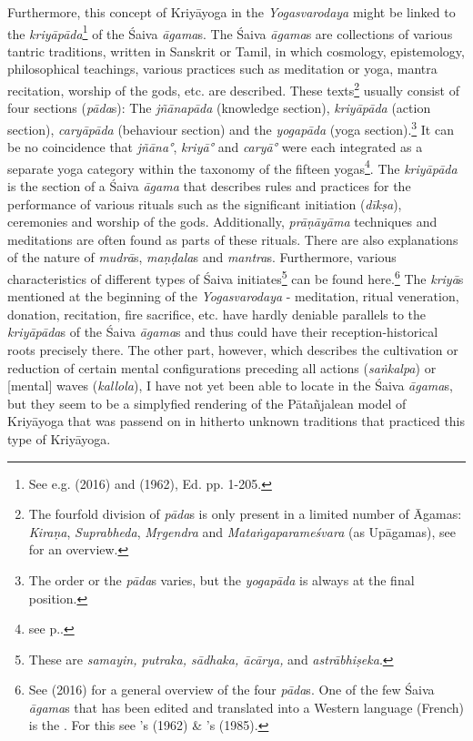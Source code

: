 Furthermore, this concept of Kriyāyoga in the \textit{Yogasvarodaya} might be linked to the \textit{kriyāpāda}\footnote{See e.g. \citeauthor{ganesan2016saiva} (2016) and  (1962), Ed. pp. 1-205.} of the Śaiva \textit{āgama}s. The Śaiva \textit{āgama}s are collections of various tantric traditions, written in Sanskrit or Tamil, in which cosmology, epistemology, philosophical teachings, various practices such as meditation or yoga, mantra recitation, worship of the gods, etc. are described. These texts\footnote{The fourfold division of \textit{pāda}s is only present in a limited number of Āgamas: \textit{Kiraṇa}, \textit{Suprabheda}, \textit{Mṛgendra} and \textit{Mataṅgaparameśvara} (as Upāgamas), see \citeauthor[1993: 225-461]{brunner1994place} for an overview.} usually consist of four sections (\textit{pāda}s): The \textit{jñānapāda} (knowledge section), \textit{kriyāpāda} (action section), \textit{caryāpāda} (behaviour section) and the \textit{yogapāda} (yoga section).\footnote{The order or the \textit{pāda}s varies, but the \textit{yogapāda} is always at the final position.} It can be no coincidence that \textit{jñāna°}, \textit{kriyā°} and \textit{caryā°} were each integrated as a separate yoga category within the taxonomy of the fifteen yogas\footnote{see p.\pageref{intro}.}. The \textit{kriyāpāda} is the section of a Śaiva \textit{āgama} that describes rules and practices for the performance of various rituals such as the significant initiation (\textit{dīkṣa}), ceremonies and worship of the gods. Additionally, \textit{prāṇāyāma} techniques and meditations are often found as parts of these rituals. There are also explanations of the nature of \textit{mudrā}s, \textit{maṇḍala}s and \textit{mantra}s. Furthermore, various characteristics of different types of Śaiva initiates\footnote{These are \textit{samayin, putraka, sādhaka, ācārya,} and \textit{astrābhiṣeka}.} can be found here.\footnote{See \citeauthor{ganesan2016saiva} (2016) for a general overview of the four \textit{pāda}s. One of the few Śaiva \textit{āgama}s that has been edited and translated into a Western language (French) is the . For this see \citeauthor{mrgendragama}'s  (1962) \& \citeauthor{mrgendragamabrunner}'s  (1985).} The \textit{kriyā}s mentioned at the beginning of the \textit{Yogasvarodaya} - meditation, ritual veneration, donation, recitation, fire sacrifice, etc. have hardly deniable parallels to the \textit{kriyāpāda}s of the Śaiva \textit{āgama}s and thus could have their reception-historical roots precisely there. The other part, however, which describes the cultivation or reduction of certain mental configurations preceding all actions (\textit{saṅkalpa}) or [mental] waves (\textit{kallola}), I have not yet been able to locate in the Śaiva \textit{āgama}s, but they seem to be a simplyfied rendering of the Pātañjalean model of Kriyāyoga that was passend on in hitherto unknown traditions that practiced this type of Kriyāyoga.

